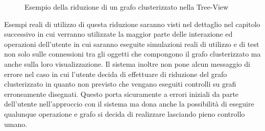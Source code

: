 {\begin{figure}[!htb]
\begin{center}
	\end{center}
	\caption{Esempio della riduzione di un grafo clusterizzato nella Tree-View \label{fig:esempioTreeRidotto}}
\end{figure}
Esempi reali di utilizzo di questa riduzione saranno visti nel dettaglio nel capitolo successivo in cui verranno utilizzate la maggior parte delle interazione ed operazioni dell'utente in cui saranno eseguite simulazioni reali di utilizzo e di test non solo sulle connessioni tra gli oggetti che compongono il grafo clusterizzato ma anche sulla loro visualizzazione. Il sistema inoltre non pone alcun messaggio di errore nel caso in cui l'utente decida di effettuare di riduzione del grafo clusterizzato in quanto non previsto che vengano eseguiti controlli su grafi erroneamente disegnati. Questo porta sicuramente a errori iniziali da parte dell'utente nell'approccio con il sistema ma dona anche la possibilità di eseguire qualunque operazione e grafo si decida di realizzare lasciando pieno controllo umano.
}
